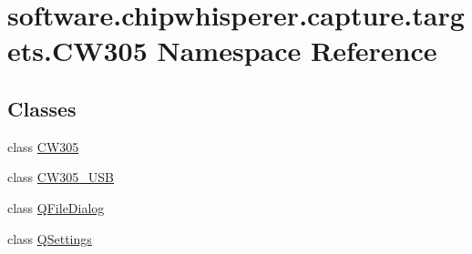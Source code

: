 \hypertarget{namespacesoftware_1_1chipwhisperer_1_1capture_1_1targets_1_1CW305}{}\section{software.\+chipwhisperer.\+capture.\+targets.\+C\+W305 Namespace Reference}
\label{namespacesoftware_1_1chipwhisperer_1_1capture_1_1targets_1_1CW305}
\subsection*{Classes}
\begin{DoxyCompactItemize}
\item 
class \hyperlink{classsoftware_1_1chipwhisperer_1_1capture_1_1targets_1_1CW305_1_1CW305}{C\+W305}
\item 
class \hyperlink{classsoftware_1_1chipwhisperer_1_1capture_1_1targets_1_1CW305_1_1CW305__USB}{C\+W305\+\_\+\+U\+S\+B}
\item 
class \hyperlink{classsoftware_1_1chipwhisperer_1_1capture_1_1targets_1_1CW305_1_1QFileDialog}{Q\+File\+Dialog}
\item 
class \hyperlink{classsoftware_1_1chipwhisperer_1_1capture_1_1targets_1_1CW305_1_1QSettings}{Q\+Settings}
\end{DoxyCompactItemize}
